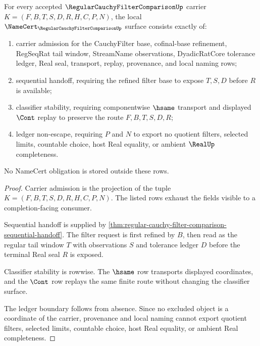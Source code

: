 \begin{theorem}
\label{thm:regular-cauchy-filter-comparison-namecert-obligations}
For every accepted $\RegularCauchyFilterComparisonUp$ carrier $K=(F,B,T,S,D,R,H,C,P,N)$, the local $\NameCert_{\RegularCauchyFilterComparisonUp}$ surface consists exactly of:
\begin{enumerate}
\item carrier admission for the CauchyFilter base, cofinal-base refinement, RegSeqRat tail window, StreamName observations, DyadicRatCore tolerance ledger, Real seal, transport, replay, provenance, and local naming rows;
\item sequential handoff, requiring the refined filter base to expose $T,S,D$ before $R$ is available;
\item classifier stability, requiring componentwise $\hsame$ transport and displayed $\Cont$ replay to preserve the route $F,B,T,S,D,R$;
\item ledger non-escape, requiring $P$ and $N$ to export no quotient filters, selected limits, countable choice, host Real equality, or ambient $\RealUp$ completeness.
\end{enumerate}
No NameCert obligation is stored outside these rows.
\end{theorem}
\begin{proof}
Carrier admission is the projection of the tuple $K=(F,B,T,S,D,R,H,C,P,N)$. The listed rows exhaust the fields visible to a completion-facing consumer.

Sequential handoff is supplied by \autoref{thm:regular-cauchy-filter-comparison-sequential-handoff}. The filter request is first refined by $B$, then read as the regular tail window $T$ with observations $S$ and tolerance ledger $D$ before the terminal Real seal $R$ is exposed.

Classifier stability is rowwise. The $\hsame$ row transports displayed coordinates, and the $\Cont$ row replays the same finite route without changing the classifier surface.

The ledger boundary follows from absence. Since no excluded object is a coordinate of the carrier, provenance and local naming cannot export quotient filters, selected limits, countable choice, host Real equality, or ambient Real completeness.
\end{proof}


